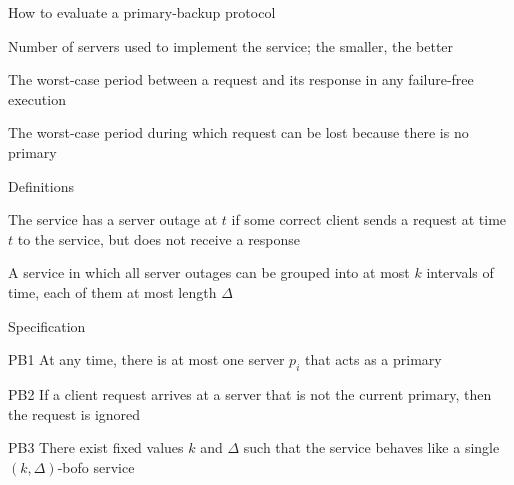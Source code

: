 \begin{frame}{How to evaluate a primary-backup protocol}

\begin{definition}
Number of servers used to implement the service; the smaller, the better
\end{definition}

\bigskip
\begin{definition}
The worst-case period between a request and its response in any failure-free execution
\end{definition}

\bigskip
\begin{definition}
The worst-case period during which request can be lost because there is no primary
\end{definition}

\end{frame}

\begin{frame}{Definitions}

\begin{definition}
The service has a server outage at $t$ if some correct client sends a request
at time $t$ to the service, but does not receive a response
\end{definition}

\bigskip
\begin{definition}
A service in which all server outages can be grouped into at most $k$
intervals of time, each of them at most length $\Delta$
\end{definition}

\end{frame}

\begin{frame}{Specification}
\BIL
\item[PB1] At any time, there is \alert{at most} one server $p_i$ that acts as
a primary
\item[PB2] If a client request arrives at a server that is not the current
primary, then the request is ignored
\item[PB3] There exist fixed values $k$ and $\Delta$ such that the service
behaves like a single $(k, \Delta)$-bofo service
\EIL
\end{frame}

